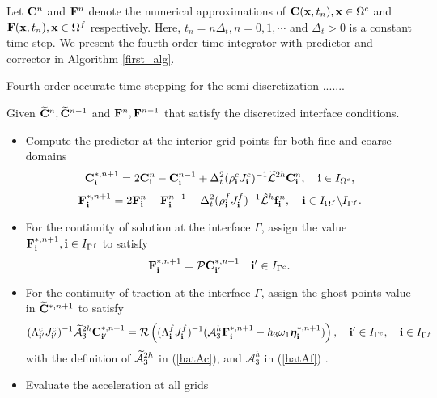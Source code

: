 Let ${\bf C}^{n}$ and ${\bf F}^{n}$ denote the numerical approximations of ${\bf C}({\bf x},t_n), {\bf x}\in\Omega^c$ and ${\bf F}({\bf x},t_n), {\bf x}\in\Omega^f$ respectively. Here, $t_n = n\Delta_t, n = 0,1,\cdots$ and $\Delta_t > 0$ is a constant time step. We present the fourth order time integrator with predictor and corrector in  Algorithm \ref{first_alg}.
~\\
\begin{breakablealgorithm}
	\caption{Fourth order accurate time stepping for the semi-discretization .......}\label{first_alg}
	Given  $\widetilde{{\bf C}}^{n}, \widetilde{{\bf C}}^{n-1}$ and ${\bf F}^{n}, {\bf F}^{n-1}$ that satisfy the discretized interface conditions.
	
	\begin{itemize}
		\item  {Compute the predictor at the interior grid points for both fine and coarse domains
			\[{\bf C}^{*,n+1}_{\bf i} = 2{\bf C}^{n}_{\bf i} - {\bf C}^{n-1}_{\bf i} + \Delta_t^2(\rho^{c}_{\bf i}J^c_{\bf i})^{-1}{\widetilde{\mathcal{L}}}^{2h} {\bf{C}}^{n}_{\bf i},\quad {\bf i}\in I_{\Omega^c},\]
			\[{\bf F}^{*,n+1}_{\bf i} = 2{\bf F}^{n}_{\bf i} - {\bf F}^{n-1}_{\bf i} + \Delta_t^2(\rho^f_{\bf i}J^f_{\bf i})^{-1}\hat{\mathcal{L}}^{h} {\bf{f}}^{n}_{\bf i},\quad {\bf i}\in I_{\Omega^f}\backslash I_{\Gamma^f}.\]
		}
		\item{For the continuity of solution at the interface $\Gamma$, assign the value ${\bf F}^{*,n+1}_{\bf i}, {\bf i}\in I_{\Gamma^f}$ to satisfy
			\begin{equation*}
			{\bf F}^{*,n+1}_{\bf i} = {\mathcal{P}}{\bf C}^{*,n+1}_{{\bf i}'} \quad {\bf i}'\in I_{\Gamma^c}.
			\end{equation*}
		}
		\item{For the continuity of traction at the interface $\Gamma$, assign the ghost points value in $\widetilde{\bf C}^{*,n+1}$ to satisfy
			\begin{equation}\label{traction_gamma_pre}
			({\Lambda}^{c}_{{\bf i}'}{J}_{{\bf i}'}^{c})^{-1}\wt{\mathcal{A}}_3^{2h}{\bf C}^{*,n+1}_{{\bf i}'}
			= {\mathcal{R}}\left(({\Lambda}^{f}_{\bf i}{J}^f_{\bf i})^{-1}(\mathcal{A}_3^h{\bf F}^{*,n+1}_{\bf i}-h_3\omega_1{\bm \eta}^{\ast,n+1}_{\bf i})\right),\quad {\bf i}'\in I_{\Gamma^c},\quad {\bf i}\in I_{\Gamma^f}
			\end{equation}
			with the definition of $\widetilde{\mathcal{A}}_3^{2h}$ in (\ref{hatAc}), and $\mathcal{A}_3^h$ in (\ref{hatAf}) .
		}
		\item{Evaluate the acceleration at all grids 
}
\end{itemize}
\end{breakablealgorithm}
